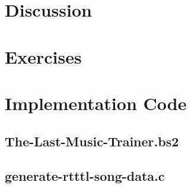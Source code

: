 \documentclass[11pt]{article}
\begin{document}
\section{Discussion}

\section{Exercises}

\clearpage

\section{Implementation Code}

\subsection{The-Last-Music-Trainer.bs2}

\begingroup
\fontsize{10pt}{12pt}

\endgroup

\clearpage
\subsection{generate-rtttl-song-data.c}


\end{document}
